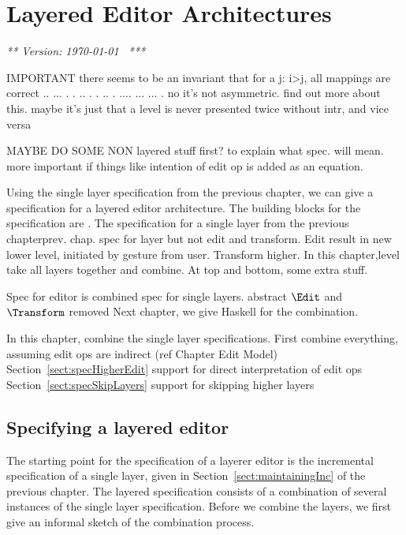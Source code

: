 \chapter{Layered Editor Architectures}
\label{chap:layeredArchs}
{\em *** Version: \today~ ***}


\bc

IMPORTANT there seems to be an invariant that for a j:  i>j, all mappings are correct 
  ..           ...       
 .  .    ..   .   .   .. 
.    ....  ...     ...  .
no it's not asymmetric. find out more about this.
maybe it's just that a level is never presented twice without intr, and vice versa


MAYBE DO SOME NON layered stuff first? to explain what spec. will mean. more important if things like intention of edit op is added as an equation.
\ec


\bc
Using the single layer specification from the previous chapter, we can give a specification for a layered editor architecture. The building blocks for the specification are . The specification for a single layer from the previous chapterprev. chap. spec for layer but not edit and transform. Edit result in new lower level, initiated by gesture from user. Transform higher. In this chapter,level take all layers together and combine. At top and bottom, some extra stuff.
\ec

\bl
\* Spec for editor is combined spec for single layers.
\* abstract $\Edit$ and $\Transform$ removed
\* Next chapter, we give Haskell for the combination.
\el

\bl
\* In this chapter, combine the single layer specifications.
\* First combine everything, assuming edit ops are indirect (ref Chapter Edit Model)
\* Section~\ref{sect:specHigherEdit} support for direct interpretation of edit ops
\* Section~\ref{sect:specSkipLayers} support for skipping higher layers
\el

\fromHere  %

\section{Specifying a layered editor}\label{sect:specCombination}

The starting point for the specification of a layerer editor is the incremental specification of a single layer, given in Section~\ref{sect:maintainingInc} of the previous chapter. The layered specification consists of a combination of several instances of the single layer specification. Before we combine the layers, we first give an informal sketch of the combination process.

